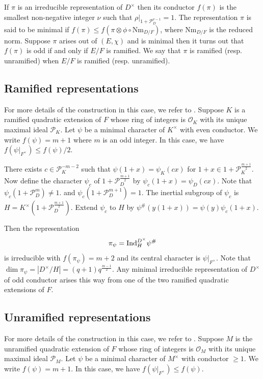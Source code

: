 \documentclass[12pt]{amsart}
\theoremstyle{definition}
\theoremstyle{remark}
\begin{document}
If $\pi$ is an irreducible representation of $D^\times$ then its conductor $f(\pi)$ is the smallest non-negative integer $\nu$ such that $\rho|_{1 + \mathcal{P}_D^{\nu-1}} = 1$. The representation $\pi$ is said to be minimal if $f(\pi) \leq f(\pi \otimes \phi \circ \mathrm{Nm}_{D/F})$, where $\mathrm{Nm}_{D/F}$ is the reduced norm. Suppose $\pi$ arises out of $(E,\chi)$ and is minimal then it turns out that $f(\pi)$ is odd if and only if $E/F$ is ramified. We say that $\pi$ is ramified (resp. unramified) when $E/F$ is ramified (resp. unramified).

\subsection{Ramified representations} For more details of the construction in this case, we refer to \cite[p. 133]{hsy93}. Suppose $K$ is a ramified quadratic extension of $F$ whose ring of integers is $\mathcal O_K$ with its unique maximal ideal $\mathcal P_K$. Let $\psi$ be a minimal character of $K^\times$ with even conductor. We write $f(\psi) = m+1$ where $m$ is an odd integer. In this case, we have $f(\psi|_{F^\times}) \leq f(\psi)/2$. 

There exists $c \in \mathcal P_K^{-m-2}$ such that $\psi(1+x) = \psi_K(cx)$ for $1+x \in 1+\mathcal P_K^{\frac{m+1}{2}}$. Now define the character $\psi_c$ of $1+\mathcal P_D^{\frac{m+1}{2}}$ by $\psi_c(1+x) = \psi_D(cx)$. Note that $\psi_c(1+\mathcal P_D^m) \neq 1$. and $\psi_c(1+\mathcal P_D^{m+1}) = 1$. The inertial subgroup of $\psi_c$ is $H = K^\times(1+\mathcal P_D^{\frac{m+1}{2}})$. Extend $\psi_c$ to $H$ by $\psi^\#(y (1+x)) = \psi(y)\psi_c(1+x)$.

Then the representation \[\pi_\psi = {\rm Ind}^{D^\times}_{H} \psi^\# \]
is irreducible with $f(\pi_\psi) = m+2$ and its central character is $\psi|_{F^\times}$. Note that $\dim \pi_\psi = |D^\times/H| = (q+1)q^{\frac{m-1}{2}}$. Any minimal irreducible representation of $D^\times$ of odd conductor arises this way from one of the two ramified quadratic extensions of $F$.

\subsection{Unramified representations} For more details of the construction in this case, we refer to \cite[p. 126]{hsy93}. Suppose $M$ is the unramified quadratic extension of $F$ whose ring of integers is $\mathcal O_M$ with its unique maximal ideal $\mathcal P_M$. Let $\psi$ be a minimal character of $M^\times$ with conductor $\geq 1$. We write $f(\psi) = m+1$. In this case, we have $f(\psi|_{F^\times}) \leq f(\psi)$. 
\end{document}
